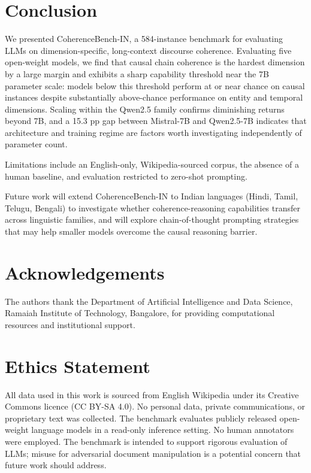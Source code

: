\documentclass{llncs}
\begin{document}
\section{Conclusion}
We presented CoherenceBench-IN,
a 584-instance benchmark for evaluating LLMs on dimension-specific,
long-context discourse coherence.
Evaluating five open-weight models, we find that
causal chain coherence is the hardest dimension by a large margin
and exhibits a sharp capability threshold near the 7B parameter scale:
models below this threshold perform at or near chance on causal instances
despite substantially above-chance performance on entity and temporal dimensions.
Scaling within the Qwen2.5 family confirms diminishing returns beyond 7B,
and a 15.3 pp gap between Mistral-7B and Qwen2.5-7B indicates that
architecture and training regime are factors worth investigating independently of parameter count.

Limitations include an English-only, Wikipedia-sourced corpus, the absence of a human baseline,
and evaluation restricted to zero-shot prompting.

Future work will extend CoherenceBench-IN to Indian languages
(Hindi, Tamil, Telugu, Bengali) to investigate whether coherence-reasoning
capabilities transfer across linguistic families,
and will explore chain-of-thought prompting strategies that may
help smaller models overcome the causal reasoning barrier.

\section*{Acknowledgements}
The authors thank the Department of Artificial Intelligence and Data Science,
Ramaiah Institute of Technology, Bangalore, for providing computational resources
and institutional support.

\section*{Ethics Statement}
All data used in this work is sourced from English Wikipedia under its Creative Commons
licence (CC BY-SA 4.0). No personal data, private communications, or proprietary text
was collected. The benchmark evaluates publicly released open-weight language models
in a read-only inference setting. No human annotators were employed.
The benchmark is intended to support rigorous evaluation of LLMs;
misuse for adversarial document manipulation is a potential concern that
future work should address.



\end{document}
